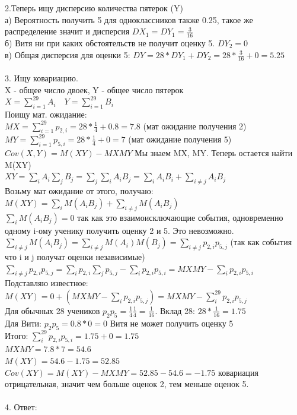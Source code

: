 \documentclass[fleqn]{article}
\begin{document}
2.Теперь ищу дисперсию количества пятерок (Y) \\
а) Вероятность получить 5 для одноклассников также 0.25, такое же распределение значит и дисперсия $DX_1 = DY_1 = \frac{3}{16}$ \\
б) Витя ни при каких обстоятельств не получит оценку 5. $DY_2 = 0$ \\
в) Общая дисперсия для оценки 5: $ DY = 28 * DY_1 + DY_2 = 28 * \frac{3}{16} + 0 = 5.25$\\
\\
3. Ищу ковариацию. \\
X - общее число двоек, Y - общее число пятерок \\
$ X = \displaystyle \sum_{i=1}^{29} A_i \quad Y = \displaystyle \sum_{i=1}^{29} B_i$ \\
Поищу мат. ожидание: \\
 $ MX = \displaystyle \sum_{i=1}^{29} p_{2, i} = 28 * \frac{1}{4} + 0.8 = 7.8$ (мат ожидание получения 2) \\
 $ MY = \displaystyle \sum_{i=1}^{29} p_{5, i} = 28 * \frac{1}{4} + 0 = 7$ (мат ожидание получения 5) \\
 $ Cov(X, Y) = M(XY) - MX MY $ Мы знаем MX, MY. Теперь остается найти M(XY) \\
 $ XY =  \displaystyle \sum_{i} A_i \displaystyle \sum_{j} B_j =  \displaystyle \sum_{j} \displaystyle \sum_{i} A_i B_j = \displaystyle \sum_{i} A_i B_i + \displaystyle \sum_{i \ne j} A_i B_j $ \\
 Возьму мат ожидание от этого, получаю: $ M(XY) =  \displaystyle \sum_{i} M(A_i B_j) + \displaystyle \sum_{i \ne j} M(A_i B_j) $ \\
$ \displaystyle \sum_{i} M(A_i B_j) = 0 $ так как это взаимоисключающие события, одновременно одному i-ому ученику получить оценку 2 и 5. Это невозможно. \\
$ \displaystyle \sum_{i \ne j} M(A_i B_j) = \displaystyle \sum_{i \ne j} M(A_i) M(B_j) =  \sum_{i \ne j} p_{2, i} p_{5, j} $ (так как события что i и j получат оценки независимые) \\
$  \displaystyle \sum_{i \ne j} p_{2, i} p_{5, j} =   \displaystyle \sum_{i } p_{2, i}  \displaystyle \sum_{j}  p_{5, j} -  \displaystyle \sum_{i} p_{2, i} p_{5, i} = MX MY -  \displaystyle \sum_{i} p_{2, i} p_{5, i}$ \\
Подставляю известное: $ M(XY) = 0 + (MX MY - \displaystyle \sum_{i } p_{2, i} p_{5, j}) =  MX MY - \displaystyle \sum_{i }^{29} p_{2, i} p_{5, j}$ \\
Для обычных 28 учеников $ p_2 p_5  = \frac{1}{4} \frac{1}{4} = \frac{1}{16} $. Вклад 28: $ 28 * \frac{1}{16} = 1.75 $ \\
Для Вити: $p_2 p_5 = 0.8 * 0 = 0$ Витя не может получить оценку 5 \\
Итого: $  \displaystyle \sum_{i }^{29} p_{2, i} p_{5, i} = 1.75 + 0 = 1.75 $ \\
$ MX MY = 7.8 * 7 = 54.6 $ \\
$ M(XY) = 54.6 - 1.75 = 52.85 $ \\
$ Cov(XY) = M(XY) - MX MY = 52.85 - 54.6 = -1.75 $ ковариация отрицательная, значит чем больше оценок 2, тем меньше оценок 5. \\
\\
4. Ответ: 
\end{document}
